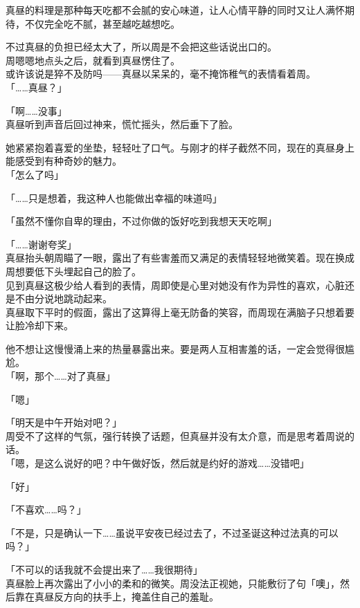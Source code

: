 真昼的料理是那种每天吃都不会腻的安心味道，让人心情平静的同时又让人满怀期待，不仅完全吃不腻，甚至越吃越想吃。

不过真昼的负担已经太大了，所以周是不会把这些话说出口的。\\

周嗯嗯地点头之后，就看到真昼愣住了。\\

或许该说是猝不及防吗——真昼以呆呆的，毫不掩饰稚气的表情看着周。\\

「……真昼？」

「啊……没事」\\

真昼听到声音后回过神来，慌忙摇头，然后垂下了脸。

她紧紧抱着喜爱的坐垫，轻轻吐了口气。与刚才的样子截然不同，现在的真昼身上能感受到有种奇妙的魅力。\\

「怎么了吗」

「……只是想着，我这种人也能做出幸福的味道吗」

「虽然不懂你自卑的理由，不过你做的饭好吃到我想天天吃啊」

「……谢谢夸奖」\\

真昼抬头朝周瞄了一眼，露出了有些害羞而又满足的表情轻轻地微笑着。现在换成周想要低下头埋起自己的脸了。\\

见到真昼这极少给人看到的表情，周即使是心里对她没有作为异性的喜欢，心脏还是不由分说地跳动起来。\\

真昼取下平时的假面，露出了这算得上毫无防备的笑容，而周现在满脑子只想着要让脸冷却下来。

他不想让这慢慢涌上来的热量暴露出来。要是两人互相害羞的话，一定会觉得很尴尬。\\

「啊，那个……对了真昼」

「嗯」

「明天是中午开始对吧？」\\

周受不了这样的气氛，强行转换了话题，但真昼并没有太介意，而是思考着周说的话。\\

「嗯，是这么说好的吧？中午做好饭，然后就是约好的游戏……没错吧」

「好」

「不喜欢……吗？」

「不是，只是确认一下……虽说平安夜已经过去了，不过圣诞这种过法真的可以吗？」

「不可以的话我就不会提出来了……我很期待」\\

真昼脸上再次露出了小小的柔和的微笑。周没法正视她，只能敷衍了句「噢」，然后靠在真昼反方向的扶手上，掩盖住自己的羞耻。
